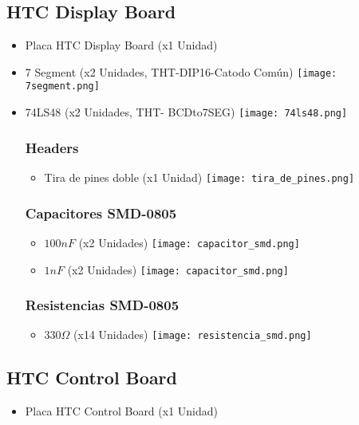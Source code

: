 \documentclass[a4paper]{article}
\numberwithin{equation}{section}
\numberwithin{figure}{section}
\begin{document}
\begin{itemize}
\subsection {HTC Display Board}
\begin{itemize}
\item Placa HTC Display Board (x1 Unidad)
\item 7 Segment (x2 Unidades, THT-DIP16-Catodo Común)
\texttt{[image: 7segment.png]}	
\item 74LS48 (x2 Unidades, THT- BCDto7SEG)
\texttt{[image: 74ls48.png]}	


\subsubsection {Headers}
\begin{itemize}
\item Tira de pines doble (x1 Unidad)
\texttt{[image: tira\_de\_pines.png]}	
\end{itemize}

\subsubsection {Capacitores SMD-0805}
\begin{itemize}
\item $100nF$ (x2 Unidades)
\texttt{[image: capacitor\_smd.png]}	
\item $1nF$ (x2 Unidades)
\texttt{[image: capacitor\_smd.png]}	
\end{itemize}

\subsubsection {Resistencias SMD-0805}
\begin{itemize}
\item $330\Omega$ (x14 Unidades)
\texttt{[image: resistencia\_smd.png]}	
\end{itemize}
\end{itemize}
\subsection {HTC Control Board}
\begin{itemize}


\item Placa HTC Control Board (x1 Unidad)


\end{itemize}
\end{itemize}
\end{document}
